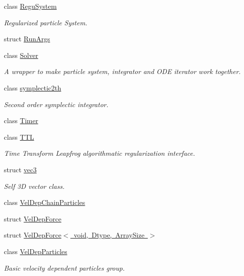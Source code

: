 \begin{DoxyCompactItemize}
class \mbox{\hyperlink{class_space_h_1_1_regu_system}{Regu\+System}}
\begin{DoxyCompactList}\small\item\em Regularized particle System. \end{DoxyCompactList}\item 
struct \mbox{\hyperlink{struct_space_h_1_1_run_args}{Run\+Args}}
\item 
class \mbox{\hyperlink{class_space_h_1_1_solver}{Solver}}
\begin{DoxyCompactList}\small\item\em A wrapper to make particle system, integrator and O\+DE iterator work together. \end{DoxyCompactList}\item 
class \mbox{\hyperlink{class_space_h_1_1symplectic2th}{symplectic2th}}
\begin{DoxyCompactList}\small\item\em Second order symplectic integrator. \end{DoxyCompactList}\item 
class \mbox{\hyperlink{class_space_h_1_1_timer}{Timer}}
\item 
class \mbox{\hyperlink{class_space_h_1_1_t_t_l}{T\+TL}}
\begin{DoxyCompactList}\small\item\em Time Transform Leapfrog algorithmatic regularization interface. \end{DoxyCompactList}\item 
struct \mbox{\hyperlink{struct_space_h_1_1vec3}{vec3}}
\begin{DoxyCompactList}\small\item\em Self 3D vector class. \end{DoxyCompactList}\item 
class \mbox{\hyperlink{class_space_h_1_1_vel_dep_chain_particles}{Vel\+Dep\+Chain\+Particles}}
\item 
struct \mbox{\hyperlink{struct_space_h_1_1_vel_dep_force}{Vel\+Dep\+Force}}
\item 
struct \mbox{\hyperlink{struct_space_h_1_1_vel_dep_force_3_01void_00_01_dtype_00_01_array_size_01_4}{Vel\+Dep\+Force$<$ void, Dtype, Array\+Size $>$}}
\item 
class \mbox{\hyperlink{class_space_h_1_1_vel_dep_particles}{Vel\+Dep\+Particles}}
\begin{DoxyCompactList}\small\item\em Basic velocity dependent particles group. \end{DoxyCompactList}\item 

\end{DoxyCompactItemize}
